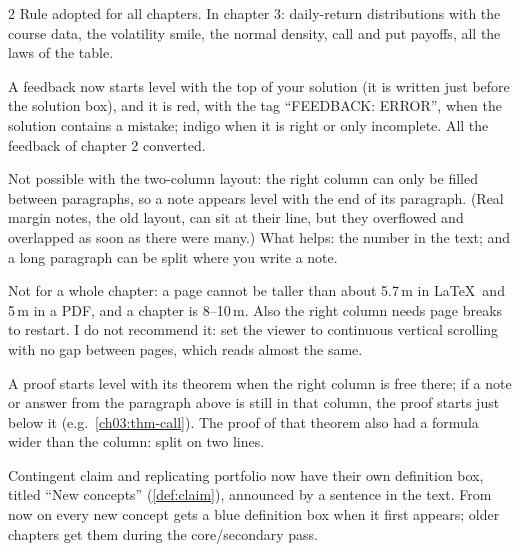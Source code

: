 \begin{paracol}{2}
{Rule adopted for all chapters. In chapter 3: daily-return distributions with the course data, the
volatility smile, the normal density, call and put payoffs, all the laws of the table.}

{A feedback now starts level with the top of your solution (it is written just before the solution
box), and it is red, with the tag ``FEEDBACK: ERROR'', when the solution contains a mistake; indigo
when it is right or only incomplete. All the feedback of chapter 2 converted.}

{Not possible with the two-column layout: the right column can only be filled between paragraphs,
so a note appears level with the end of its paragraph. (Real margin notes, the old layout, can sit
at their line, but they overflowed and overlapped as soon as there were many.) What helps: the
number in the text; and a long paragraph can be split where you write a note.}

{Not for a whole chapter: a page cannot be taller than about 5.7\,m in \LaTeX\ and 5\,m in a PDF, and a
chapter is 8--10\,m. Also the right column needs page breaks to restart. I do not recommend it: set the
viewer to continuous vertical scrolling with no gap between pages, which reads almost the same.}

{A proof starts level with its theorem when the right column is free there; if a note or answer from the
paragraph above is still in that column, the proof starts just below it (e.g.\ \cref{ch03:thm-call}). The
proof of that theorem also had a formula wider than the column: split on two lines.}

{Contingent claim and replicating portfolio now have their own definition box, titled ``New concepts''
(\cref{def:claim}), announced by a sentence in the text. From now on every new concept gets a blue
definition box when it first appears; older chapters get them during the core/secondary pass.}


\end{paracol}
